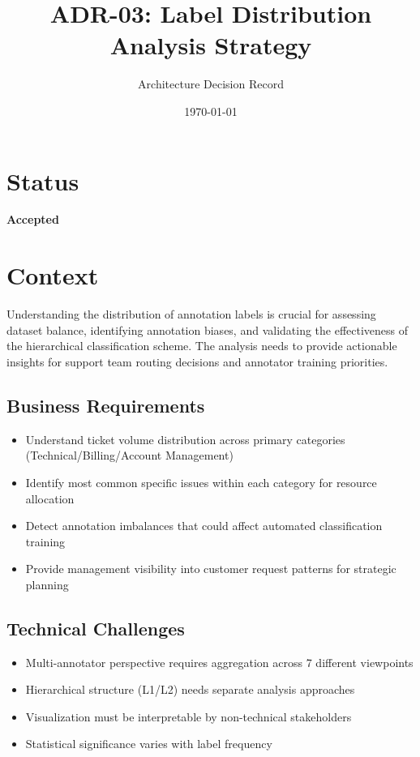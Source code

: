 \documentclass[11pt]{article}
\title{\textbf{ADR-03: Label Distribution Analysis Strategy}}
\author{Architecture Decision Record}
\date{\today}
\begin{document}
\maketitle

\section{Status}
\textbf{Accepted}

\section{Context}

Understanding the distribution of annotation labels is crucial for assessing dataset balance, identifying annotation biases, and validating the effectiveness of the hierarchical classification scheme. The analysis needs to provide actionable insights for support team routing decisions and annotator training priorities.

\subsection{Business Requirements}
\begin{itemize}
\item Understand ticket volume distribution across primary categories (Technical/Billing/Account Management)
\item Identify most common specific issues within each category for resource allocation
\item Detect annotation imbalances that could affect automated classification training
\item Provide management visibility into customer request patterns for strategic planning
\end{itemize}

\subsection{Technical Challenges}
\begin{itemize}
\item Multi-annotator perspective requires aggregation across 7 different viewpoints
\item Hierarchical structure (L1/L2) needs separate analysis approaches
\item Visualization must be interpretable by non-technical stakeholders
\item Statistical significance varies with label frequency
\end{itemize}
\end{document}
